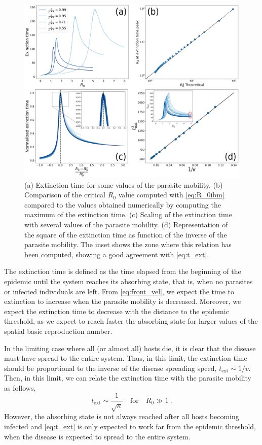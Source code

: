 \begin{figure}[H]
    \centering
    \includegraphics[width=\textwidth]{Figures/Extinction_time.png}
    \caption{(a) Extinction time for some values of the parasite mobility.
        (b) Comparison of the critical $R_0$ value computed with
        \cref{eq:R_0ibm}
        compared to the values obtained numerically by computing the maximum of
        the
        extinction time. (c) Scaling of the extinction time with several values
        of the
        parasite mobility. (d) Representation of the square of the extinction
        time as
        function of the inverse of the parasite mobility. The inset shows the
        zone
        where this relation has been computed, showing a good agreement with
        \cref{eq:t_ext}.}
    \label{fig:extinction_time}
\end{figure}

The extinction time is defined as the time elapsed from the beginning of
the epidemic until the system reaches its absorbing state, that is, when no
parasites or infected individuals are left. From \cref{eq:front_vel}, we expect
the time to extinction to increase when the parasite mobility is decreased.
Moreover, we expect the extinction time to decrease with the distance to the
epidemic threshold, as we expect to reach faster the absorbing state for larger
values of the spatial basic reproduction number.

In the limiting case where all (or almost all) hosts die, it is clear that
the disease must have spread to the entire system. Thus, in this limit, the
extinction time should be proportional to the inverse of the disease spreading
speed, $t_{\textrm{ext}}\sim 1/v$. Then, in this limit, we can relate the
extinction time with the parasite mobility as follows,
\begin{equation}\label{eq:t_ext}
    t_{\textrm{ext}}\sim\frac{1}{\sqrt{\kappa}} \quad \textrm{for} \quad
    \tilde{R}_0\gg1 \ .
\end{equation}
However, the absorbing state is not always reached after all hosts becoming
infected and \cref{eq:t_ext} is only expected to work far from the epidemic
threshold, when the disease is expected to spread to the entire system.

